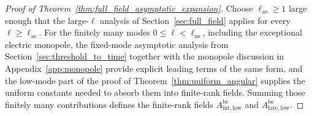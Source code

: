 \documentclass[12pt]{article}
\numberwithin{equation}{section}
\theoremstyle{plain}
\theoremstyle{definition}
\theoremstyle{remark}
\newcommand{\bc}{\mathrm{bc}}
\begin{document}
\begin{proof}[Proof of Theorem~\ref{thm:full_field_asymptotic_expansion}]
Choose $\ell_{\mathrm{as}}\ge1$ large enough that the large-$\ell$ analysis of Section~\ref{sec:full_field} applies for every $\ell\ge\ell_{\mathrm{as}}$.  For the finitely many modes $0\le\ell<\ell_{\mathrm{as}}$, including the exceptional electric monopole, the fixed-mode asymptotic analysis from Section~\ref{sec:threshold_to_time} together with the monopole discussion in Appendix~\ref{app:monopole} provide explicit leading terms of the same form, and the low-mode part of the proof of Theorem~\ref{thm:uniform_angular} supplies the uniform constants needed to absorb them into finite-rank fields.  Summing those finitely many contributions defines the finite-rank fields $A^{\bc}_{\mathrm{int,low}}$ and $A^{\bc}_{\mathrm{late,low}}$.


\end{proof}
\end{document}
